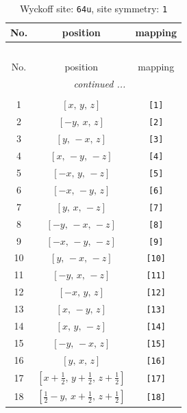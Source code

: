 \documentclass[fleqn,8pt]{jsarticle}
\begin{document}
\begin{longtable}{ccc}
\caption{Wyckoff site: {\tt 64u}, site symmetry: {\tt 1}}
 \\
 \hline \hline
No. & position & mapping \\ \hline \endfirsthead

\multicolumn{2}{l}{\tablename\ \thetable{}} \\
 \hline \hline
No. & position & mapping \\ \hline \endhead

 \hline \hline
\multicolumn{2}{r}{\footnotesize\it continued ...} \\ \endfoot

 \hline \hline
\multicolumn{2}{r}{} \\ \endlastfoot

1 & $\left[ x,\, y,\, z \right]$ & {\tt [1]} \\ \hline
2 & $\left[ - y,\, x,\, z \right]$ & {\tt [2]} \\ \hline
3 & $\left[ y,\, - x,\, z \right]$ & {\tt [3]} \\ \hline
4 & $\left[ x,\, - y,\, - z \right]$ & {\tt [4]} \\ \hline
5 & $\left[ - x,\, y,\, - z \right]$ & {\tt [5]} \\ \hline
6 & $\left[ - x,\, - y,\, z \right]$ & {\tt [6]} \\ \hline
7 & $\left[ y,\, x,\, - z \right]$ & {\tt [7]} \\ \hline
8 & $\left[ - y,\, - x,\, - z \right]$ & {\tt [8]} \\ \hline
9 & $\left[ - x,\, - y,\, - z \right]$ & {\tt [9]} \\ \hline
10 & $\left[ y,\, - x,\, - z \right]$ & {\tt [10]} \\ \hline
11 & $\left[ - y,\, x,\, - z \right]$ & {\tt [11]} \\ \hline
12 & $\left[ - x,\, y,\, z \right]$ & {\tt [12]} \\ \hline
13 & $\left[ x,\, - y,\, z \right]$ & {\tt [13]} \\ \hline
14 & $\left[ x,\, y,\, - z \right]$ & {\tt [14]} \\ \hline
15 & $\left[ - y,\, - x,\, z \right]$ & {\tt [15]} \\ \hline
16 & $\left[ y,\, x,\, z \right]$ & {\tt [16]} \\ \hline
17 & $\left[ x + \frac{1}{2},\, y + \frac{1}{2},\, z + \frac{1}{2} \right]$ & {\tt [17]} \\ \hline
18 & $\left[ \frac{1}{2} - y,\, x + \frac{1}{2},\, z + \frac{1}{2} \right]$ & {\tt [18]} \\ \hline

\end{longtable}
\end{document}

